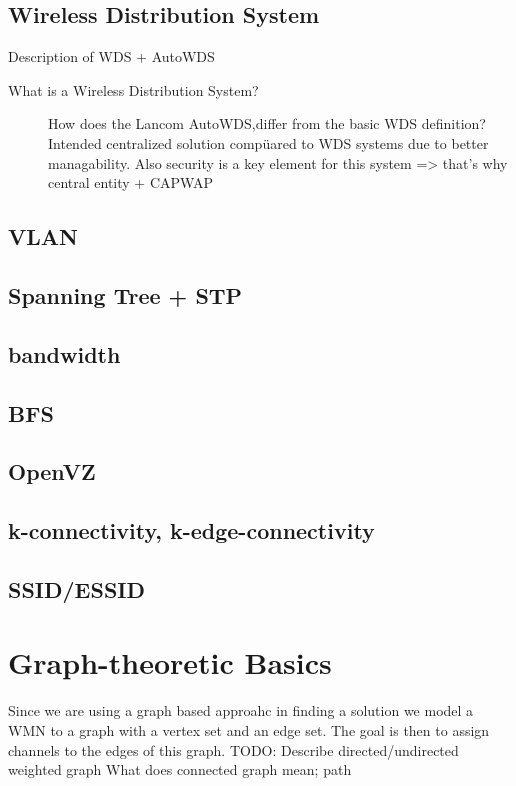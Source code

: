     \subsection{Wireless Distribution System}
    Description of WDS + AutoWDS \newline
      \begin{description}
       \item[What is a Wireless Distribution System?]
       How does the Lancom \ac{AutoWDS},differ from the basic WDS definition?
	 Intended centralized solution compüared to WDS systems due to better managability.
	 Also security is a key element for this system => that's why central entity + CAPWAP
      \end{description}
      \subsection{VLAN}
      \subsection{Spanning Tree + STP}
      \subsection{bandwidth}
      \subsection{BFS}
      \subsection{OpenVZ}
	\cite{openvz}
      \subsection{k-connectivity, k-edge-connectivity}
      \subsection{SSID/ESSID}
\section{Graph-theoretic Basics}
  Since we are using a graph based approahc in finding a solution we model a \ac{WMN} to a graph with a vertex set and an edge set. The goal is then to assign channels
  to the edges of this graph.
  TODO: Describe directed/undirected weighted graph
  What does connected graph mean; path
